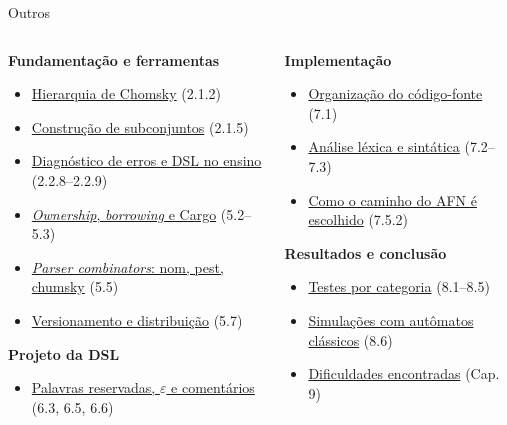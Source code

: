 \documentclass[aspectratio=169,12pt]{beamer}
\newcommand{\itemreserva}[3]{\item \hyperlink{#1}{\textcolor{acento}{#2}} {\scriptsize\color{gray}(#3)}}
\begin{document}
\begin{frame}[label=reserva]{Outros}
  \begin{columns}[T]
    \begin{column}{0.5\textwidth}
      \footnotesize
      \textbf{Fundamentação e ferramentas}
      \begin{itemize}\setlength{\itemsep}{1pt}
        \itemreserva{res-chomsky}{Hierarquia de Chomsky}{2.1.2}
        \itemreserva{res-subconjuntos}{Construção de subconjuntos}{2.1.5}
        \itemreserva{res-diagnostico}{Diagnóstico de erros e DSL no ensino}{2.2.8--2.2.9}
        \itemreserva{res-ownership}{\textit{Ownership}, \textit{borrowing} e Cargo}{5.2--5.3}
        \itemreserva{res-combinators}{\textit{Parser combinators}: nom, pest, chumsky}{5.5}
        \itemreserva{res-distribuicao}{Versionamento e distribuição}{5.7}
      \end{itemize}
      \textbf{Projeto da DSL}
      \begin{itemize}\setlength{\itemsep}{1pt}
        \itemreserva{res-palavras}{Palavras reservadas, $\varepsilon$ e comentários}{6.3, 6.5, 6.6}
      \end{itemize}
    \end{column}
    \begin{column}{0.5\textwidth}
      \footnotesize
      \textbf{Implementação}
      \begin{itemize}\setlength{\itemsep}{1pt}
        \itemreserva{res-codigo}{Organização do código-fonte}{7.1}
        \itemreserva{res-lexsin}{Análise léxica e sintática}{7.2--7.3}
        \itemreserva{res-caminho}{Como o caminho do AFN é escolhido}{7.5.2}
      \end{itemize}
      \textbf{Resultados e conclusão}
      \begin{itemize}\setlength{\itemsep}{1pt}
        \itemreserva{res-testes}{Testes por categoria}{8.1--8.5}
        \itemreserva{res-classicos}{Simulações com autômatos clássicos}{8.6}
        \itemreserva{res-dificuldades}{Dificuldades encontradas}{Cap. 9}
      \end{itemize}
      \vspace{4pt}
      \hyperlink{perguntas}{}
    \end{column}
  \end{columns}
\end{frame}
\end{document}
